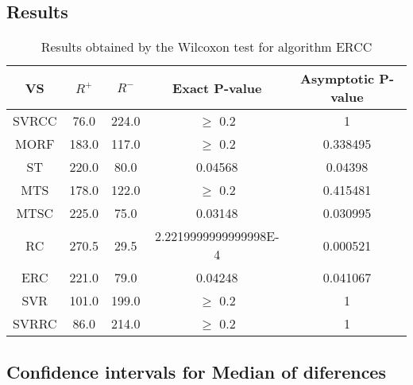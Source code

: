 \documentclass[a4paper,10pt]{article}
\begin{document}
\subsection{Results}

\begin{table}[!htp]
\centering\small
\begin{tabular}{
|c|c|c|c|c|}
\hline
 VS & $R^{+}$ & $R^{-}$ & Exact P-value & Asymptotic P-value \\ \hline 
SVRCC & 76.0 & 224.0 & $\geq$ 0.2 & 1\\ \hline 
MORF & 183.0 & 117.0 & $\geq$ 0.2 & 0.338495\\ \hline 
ST & 220.0 & 80.0 & 0.04568 & 0.04398\\ \hline 
MTS & 178.0 & 122.0 & $\geq$ 0.2 & 0.415481\\ \hline 
MTSC & 225.0 & 75.0 & 0.03148 & 0.030995\\ \hline 
RC & 270.5 & 29.5 & 2.2219999999999998E-4 & 0.000521\\ \hline 
ERC & 221.0 & 79.0 & 0.04248 & 0.041067\\ \hline 
SVR & 101.0 & 199.0 & $\geq$ 0.2 & 1\\ \hline 
SVRRC & 86.0 & 214.0 & $\geq$ 0.2 & 1\\ \hline 

\end{tabular}
\caption{Results obtained by the Wilcoxon test for algorithm ERCC}
\end{table}

\subsection{Confidence intervals for Median of diferences}
\end{document}
